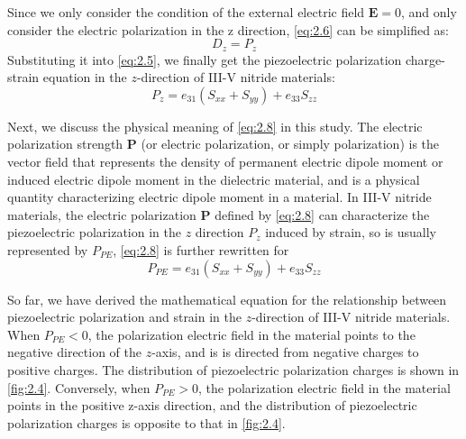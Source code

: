 Since we only consider the condition of the external electric field  $\mathbf{E}=0$, and only consider the electric polarization in the z direction, \autoref{eq:2.6} can be simplified as:
\begin{equation}
D_{z}=P_{z}
\label{eq:2.7}
\end{equation}
Substituting it into \autoref{eq:2.5}, we finally get the  piezoelectric polarization charge-strain  equation in the $z$-direction of III-V nitride  materials:
\begin{equation}
P_{z} =e_{31}\left(S_{x x}+S_{y y}\right)+e_{33} S_{z z}
\label{eq:2.8}
\end{equation}

Next, we discuss the physical meaning of \autoref{eq:2.8} in this study. The electric polarization  strength $\mathbf{P}$ (or electric polarization, or simply polarization) is the vector field that represents the density of permanent electric dipole moment  or induced electric dipole moment in the dielectric material, and is a physical quantity characterizing electric dipole moment in a material. In III-V nitride  materials, the electric polarization $\mathbf{P}$ defined by \autoref{eq:2.8} can characterize the piezoelectric polarization  in the $z$ direction $P_{z}$ induced by  strain, so is usually represented by $P_{PE}$, \autoref{eq:2.8} is further rewritten for
\begin{equation}
P_{PE} =e_{31}\left(S_{x x}+S_{y y}\right)+e_{33} S_{z z}
\label{eq:2.9}
\end{equation}

So far, we have derived the mathematical equation for the relationship between piezoelectric polarization  and strain  in the $z$-direction of III-V nitride  materials. When $P_{PE}< 0$, the polarization electric field  in the material points to the negative direction of the $z$-axis, and is is directed from negative charges to positive charges. The distribution of piezoelectric polarization charges  is shown in \autoref{fig:2.4}. Conversely, when $P_{PE} > 0$, the polarization electric field in the material points in the positive z-axis direction, and the distribution of piezoelectric polarization charges is opposite to that in \autoref{fig:2.4}.

